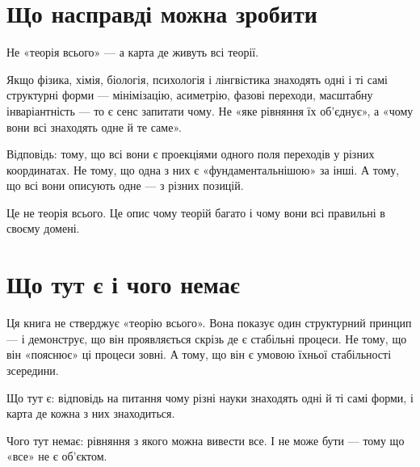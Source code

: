 \documentclass[12pt, a4paper, openany]{book}
\begin{document}
\section{Що насправді можна зробити}

Не «теорія всього» — а карта де живуть всі теорії.

Якщо фізика, хімія, біологія, психологія і лінгвістика знаходять одні і ті самі структурні форми — мінімізацію, асиметрію, фазові переходи, масштабну інваріантність — то є сенс запитати чому. Не «яке рівняння їх об'єднує», а «чому вони всі знаходять одне й те саме».

Відповідь: тому, що всі вони є проекціями одного поля переходів у різних координатах. Не тому, що одна з них є «фундаментальнішою» за інші. А тому, що всі вони описують одне — з різних позицій.

Це не теорія всього. Це опис чому теорій багато і чому вони всі правильні в своєму домені.

\section{Що тут є і чого немає}

Ця книга не стверджує «теорію всього». Вона показує один структурний принцип — і демонструє, що він проявляється скрізь де є стабільні процеси. Не тому, що він «пояснює» ці процеси зовні. А тому, що він є умовою їхньої стабільності зсередини.

Що тут є: відповідь на питання чому різні науки знаходять одні й ті самі форми, і карта де кожна з них знаходиться.

Чого тут немає: рівняння з якого можна вивести все. І не може бути — тому що «все» не є об'єктом.
\end{document}

